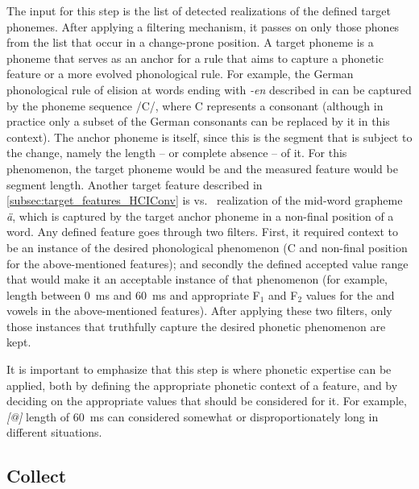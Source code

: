 The input for this step is the list of detected realizations of the defined target phonemes. After applying a filtering mechanism, it passes on only those phones from the list that occur in a change-prone position.
A target phoneme is a phoneme that serves as an anchor for a rule that aims to capture a phonetic feature or a more evolved phonological rule.
For example, the German phonological rule of \textipa{[@]} elision at words ending with \emph{-en} described in  can be captured by the phoneme sequence /C/, where C represents a consonant (although in practice only a subset of the German consonants can be replaced by it in this context).
The anchor phoneme is \textipa{[@]} itself, since this is the segment that is subject to the change, namely the length -- or complete absence -- of it.
For this phenomenon, the target phoneme would be  and the measured feature would be segment length.
Another target feature described in \cref{subsec:target_features_HCIConv} is \textipa{[e:]} vs.\ \textipa{[E:]} realization of the mid-word grapheme \emph{ä}, which is captured by the target anchor phoneme \textipa{[E]} in a non-final position of a word.
Any defined feature goes through two filters. First, it required context to be an instance of the desired phonological phenomenon (C and non-final position for the above-mentioned features);
and secondly the defined accepted value range that would make it an acceptable instance of that phenomenon (for example, \textipa{[@]} length between \SI{0}{\milli\second} and \SI{60}{\milli\second} and appropriate F$_1$ and F$_2$ values for the \textipa{[e:]} and \textipa{[E:]} vowels in the above-mentioned features).
After applying these two filters, only those instances that truthfully capture the desired phonetic phenomenon are kept.

It is important to emphasize that this step is where phonetic expertise can be applied, both by defining the appropriate phonetic context of a feature, and by deciding on the appropriate values that should be considered for it.
For example, \textit{[@]} length of \SI{60}{\milli\second} can considered somewhat or disproportionately long in different situations. 

\subsection{Collect}
\label{subsec:collect}

